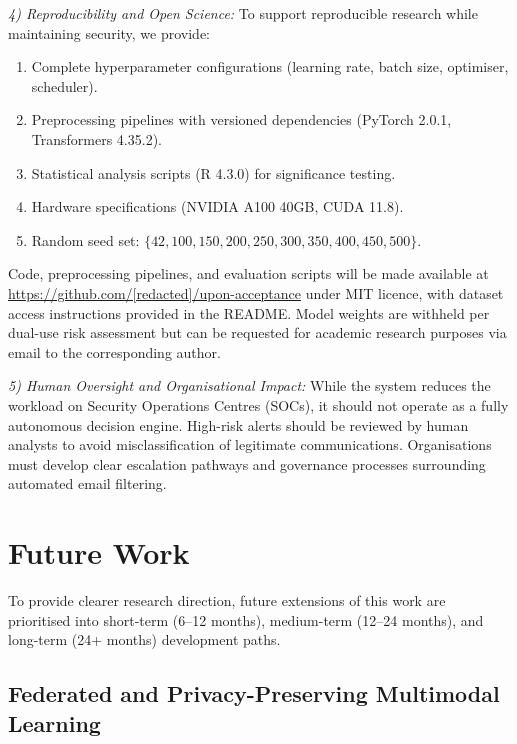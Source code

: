 \documentclass[conference]{IEEEtran}
\begin{document}
\textit{4) Reproducibility and Open Science:} To support reproducible research while maintaining security, we provide:
\begin{enumerate}
    \item Complete hyperparameter configurations (learning rate, batch size, optimiser, scheduler).
    \item Preprocessing pipelines with versioned dependencies (PyTorch 2.0.1, Transformers 4.35.2).
    \item Statistical analysis scripts (R 4.3.0) for significance testing.
    \item Hardware specifications (NVIDIA A100 40GB, CUDA 11.8).
    \item Random seed set: $\{42, 100, 150, 200, 250, 300, 350, 400, 450, 500\}$.
\end{enumerate}

Code, preprocessing pipelines, and evaluation scripts will be made available at \url{https://github.com/[redacted]/upon-acceptance} under MIT licence, with dataset access instructions provided in the README. Model weights are withheld per dual-use risk assessment but can be requested for academic research purposes via email to the corresponding author.

\textit{5) Human Oversight and Organisational Impact:} While the system reduces the workload on Security Operations Centres (SOCs), it should not operate as a fully autonomous decision engine. High-risk alerts should be reviewed by human analysts to avoid misclassification of legitimate communications. Organisations must develop clear escalation pathways and governance processes surrounding automated email filtering.

\section{Future Work}

To provide clearer research direction, future extensions of this work are prioritised into short-term (6--12 months), medium-term (12--24 months), and long-term (24+ months) development paths.

\subsection{Federated and Privacy-Preserving Multimodal Learning}
\end{document}
